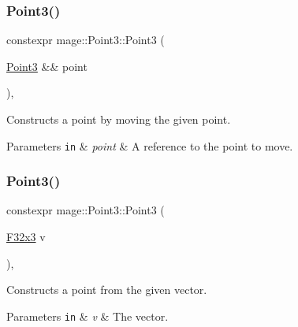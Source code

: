 \subsubsection{\texorpdfstring{Point3()}{Point3()}\hspace{0.1cm}{\footnotesize\ttfamily [4/5]}}
{\footnotesize\ttfamily constexpr mage\+::\+Point3\+::\+Point3 (\begin{DoxyParamCaption}\item[{\mbox{\hyperlink{structmage_1_1_point3}{Point3}} \&\&}]{point }\end{DoxyParamCaption})\hspace{0.3cm}{\ttfamily [default]}, {\ttfamily [noexcept]}}

Constructs a point by moving the given point.


\begin{DoxyParams}[1]{Parameters}
\mbox{\tt in}  & {\em point} & A reference to the point to move. \\
\hline
\end{DoxyParams}
\mbox{\label{structmage_1_1_point3_ae92569a8f17984726f2d0a15ef183aa5}} 
\subsubsection{\texorpdfstring{Point3()}{Point3()}\hspace{0.1cm}{\footnotesize\ttfamily [5/5]}}
{\footnotesize\ttfamily constexpr mage\+::\+Point3\+::\+Point3 (\begin{DoxyParamCaption}\item[{\mbox{\hyperlink{namespacemage_a1e3c7a882af461f161caa1cbddaf1fa2}{F32x3}}}]{v }\end{DoxyParamCaption})\hspace{0.3cm}{\ttfamily [explicit]}, {\ttfamily [noexcept]}}

Constructs a point from the given vector.


\begin{DoxyParams}[1]{Parameters}
\mbox{\tt in}  & {\em v} & The vector. \\
\hline
\end{DoxyParams}
\mbox{\label{structmage_1_1_point3_a952151b6ff72b68569f95445c2ac2495}} 
